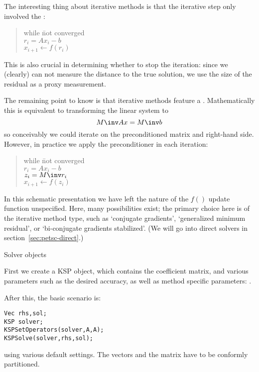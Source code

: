 The interesting thing about iterative methods is that the iterative step
only involved the :

\begin{quote}
  \begin{tabbing}
    while \=not converged\\
    \> $r_i = Ax_i-b$\\
    \> $x_{i+1}\leftarrow f(r_i)$
  \end{tabbing}
\end{quote}

This  is also crucial in determining whether to stop the iteration:
since we (clearly) can not measure the distance to the true solution, we use
the size of the residual as a proxy measurement.

The remaining point to know is that iterative methods feature a .
Mathematically this is equivalent to transforming the linear system to
\[ M\inv Ax=M\inv b \]
so conceivably we could iterate on the preconditioned matrix and right-hand side.
However, in practice we apply the preconditioner in each iteration:

\begin{quote}
  \begin{tabbing}
    while \=not converged\\
    \> $r_i = Ax_i-b$\\
    \> $z_i = M\inv r_i$\\
    \> $x_{i+1}\leftarrow f(z_i)$
  \end{tabbing}
\end{quote}

In this schematic presentation we have left the nature of the $f()$ update
function unspecified. Here, many possibilities exist; the primary
choice here is of the iterative method type, such as `conjugate gradients',
`generalized minimum residual', or `bi-conjugate gradients stabilized'.
(We will go into direct solvers in section~\ref{sec:petsc-direct}.)

 {Solver objects}

First we create a KSP object, which contains the coefficient matrix,
and various parameters such as the desired accuracy,
as well as method specific parameters:
%
.

After this, the basic scenario is:
\begin{lstlisting}
Vec rhs,sol;
KSP solver;
KSPSetOperators(solver,A,A);
KSPSolve(solver,rhs,sol);
\end{lstlisting}
using various default settings. The vectors and the matrix have to be
conformly partitioned.

